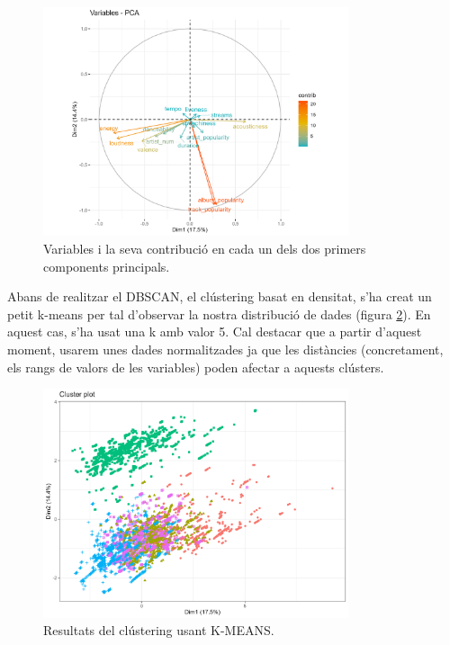 \documentclass{article}
\begin{document}
\begin{figure}[H]
    \centering
    \includegraphics[width=0.8\textwidth]{Images/4_clustering/DBSCAN/dbscanpcacomponents.png}
    \caption{Variables i la seva contribució en cada un dels dos primers components principals.}
    \label{fig:DBSCAN_pca_contrib}
\end{figure}

Abans de realitzar el DBSCAN, el clústering basat en densitat, s’ha creat un petit k-means per tal d’observar la nostra distribució de dades  (figura \ref{fig:KMEANS}). En aquest cas, s’ha usat una k amb valor 5. Cal destacar que a partir d'aquest moment, usarem unes dades normalitzades ja que les distàncies (concretament, els rangs de valors de les variables) poden afectar a aquests clústers.

\begin{figure}[H]
    \centering
    \includegraphics[width=0.8\textwidth]{Images/4_clustering/DBSCAN/kmeans.png}
    \caption{Resultats del clústering usant K-MEANS.}
    \label{fig:KMEANS}
\end{figure}
\end{document}
